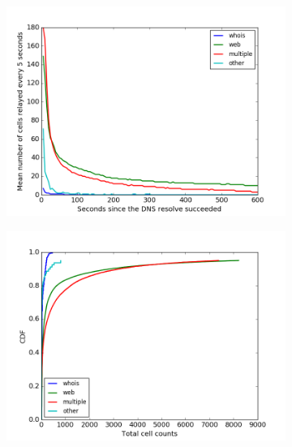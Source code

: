 \begin{figure}
	\centering
	\begin{subfigure}[t]{0.32\textwidth}
		\centering
		\includegraphics[scale=0.28]{images/exitmeasurement.png}
		\label{fig:stats_a}
	\end{subfigure}
	\begin{subfigure}[t]{0.32\textwidth}
		\centering
		\includegraphics[scale=0.28]{images/totcellcountscdf.png}
		\label{fig:stats_b}
	\end{subfigure}
	\begin{subfigure}[t]{0.32\textwidth}
		\centering

\end{subfigure}
\end{figure}
